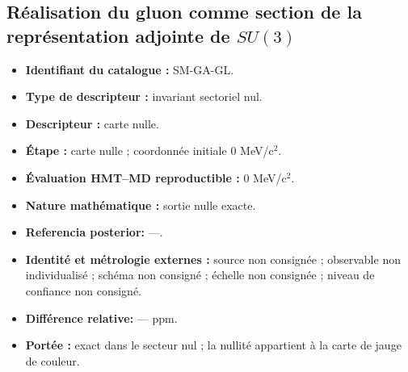 \subsection{Réalisation du gluon comme section de la représentation adjointe de \(SU(3)\)}
\begin{itemize}
\item \textbf{Identifiant du catalogue :} SM-GA-GL.
\item \textbf{Type de descripteur :} invariant sectoriel nul.
\item \textbf{Descripteur :} carte nulle.
\item \textbf{Étape :} carte nulle ; coordonnée initiale 0 MeV/c\({}^{2}\).
\item \textbf{Évaluation HMT--MD reproductible :} 0 MeV/c\({}^{2}\).
\item \textbf{Nature mathématique :} sortie nulle exacte.
\item \textbf{Referencia posterior:} ---.
\item \textbf{Identité et métrologie externes :} source non consignée ; observable non individualisé ; schéma non consigné ; échelle non consignée ; niveau de confiance non consigné.
\item \textbf{Différence relative:} --- ppm.
\item \textbf{Portée :} exact dans le secteur nul ; la nullité appartient à la carte de jauge de couleur.
\end{itemize}
